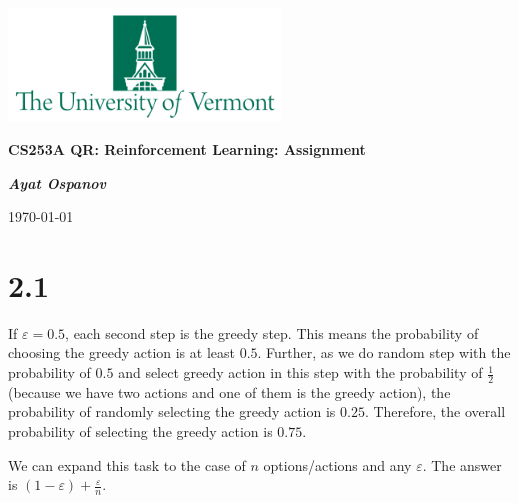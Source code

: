 \documentclass[12pt, a4paper]{article}
\begin{document}
    \begin{center}
        \includegraphics[height=3cm]{UVM.png}

        {\large\textbf{
            CS253A QR: Reinforcement Learning: Assignment 
        }}

        \vspace{0.3cm}

        \textit{\textbf{Ayat Ospanov}}

        \today
    \end{center}

    \tableofcontents
    \section{2.1}\label{sec:2.1}
        If $\varepsilon = 0.5$, each second step is the greedy step. This means the probability
        of choosing the greedy action is at least $0.5$. Further, as we do random step with the
        probability of $0.5$ and select greedy action in this step with the probability of $\frac{1}{2}$
        (because we have two actions and one of them is the greedy action), the probability of
        randomly selecting the greedy action is $0.25$. Therefore, the overall probability of
        selecting the greedy action is $0.75$.

        We can expand this task to the case of $n$ options/actions and any $\varepsilon$. The answer
        is $(1 - \varepsilon) + \frac{\varepsilon}{n}$.
\end{document}
